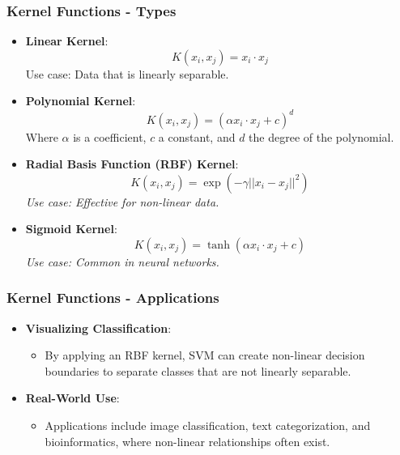 \documentclass{beamer}
\begin{document}
\begin{frame}[fragile]
    \frametitle{Kernel Functions - Types}
    \begin{itemize}
        \item \textbf{Linear Kernel}: 
            \begin{equation}
                K(x_i, x_j) = x_i \cdot x_j
            \end{equation}
            \noindent Use case: Data that is linearly separable.
            
        \item \textbf{Polynomial Kernel}:
            \begin{equation}
                K(x_i, x_j) = (\alpha x_i \cdot x_j + c)^d
            \end{equation}
            \noindent Where \( \alpha \) is a coefficient, \( c \) a constant, and \( d \) the degree of the polynomial.
            
        \item \textbf{Radial Basis Function (RBF) Kernel}:
            \begin{equation}
                K(x_i, x_j) = \exp(-\gamma ||x_i - x_j||^2)
            \end{equation}
            \noindent \textit{Use case: Effective for non-linear data.}
            
        \item \textbf{Sigmoid Kernel}:
            \begin{equation}
                K(x_i, x_j) = \tanh(\alpha x_i \cdot x_j + c)
            \end{equation}
            \noindent \textit{Use case: Common in neural networks.}
    \end{itemize}
\end{frame}

\begin{frame}[fragile]
    \frametitle{Kernel Functions - Applications}
    \begin{itemize}
        \item \textbf{Visualizing Classification}:
            \begin{itemize}
                \item By applying an RBF kernel, SVM can create non-linear decision boundaries to separate classes that are not linearly separable.
            \end{itemize}
        \item \textbf{Real-World Use}:
            \begin{itemize}
                \item Applications include image classification, text categorization, and bioinformatics, where non-linear relationships often exist.
            \end{itemize}
    \end{itemize}
\end{frame}
\end{document}

